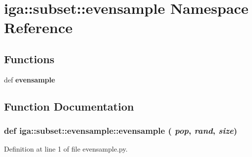 \section{iga::subset::evensample Namespace Reference}
\label{namespaceiga_1_1subset_1_1evensample}


\subsection*{Functions}
\begin{CompactItemize}
\item 
def {\bf evensample}
\end{CompactItemize}


\subsection{Function Documentation}
\subsubsection{\setlength{\rightskip}{0pt plus 5cm}def iga::subset::evensample::evensample ( {\em pop},  {\em rand},  {\em size})}\label{namespaceiga_1_1subset_1_1evensample_b6ede0602691ef7bc42f84a74c904088}




Definition at line 1 of file evensample.py.